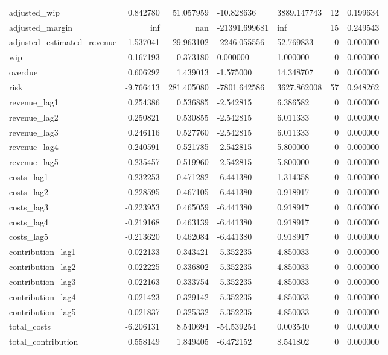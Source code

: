 \begin{landscape}
\begin{longtable}[h!]{lrrllrr}
adjusted_wip & 0.842780 & 51.057959 & -10.828636 & 3889.147743 & 12 & 0.199634 \\
adjusted_margin & inf & nan & -21391.699681 & inf & 15 & 0.249543 \\
adjusted_estimated_revenue & 1.537041 & 29.963102 & -2246.055556 & 52.769833 & 0 & 0.000000 \\
wip & 0.167193 & 0.373180 & 0.000000 & 1.000000 & 0 & 0.000000 \\
overdue & 0.606292 & 1.439013 & -1.575000 & 14.348707 & 0 & 0.000000 \\
risk & -9.766413 & 281.405080 & -7801.642586 & 3627.862008 & 57 & 0.948262 \\
revenue_lag1 & 0.254386 & 0.536885 & -2.542815 & 6.386582 & 0 & 0.000000 \\
revenue_lag2 & 0.250821 & 0.530855 & -2.542815 & 6.011333 & 0 & 0.000000 \\
revenue_lag3 & 0.246116 & 0.527760 & -2.542815 & 6.011333 & 0 & 0.000000 \\
revenue_lag4 & 0.240591 & 0.521785 & -2.542815 & 5.800000 & 0 & 0.000000 \\
revenue_lag5 & 0.235457 & 0.519960 & -2.542815 & 5.800000 & 0 & 0.000000 \\
costs_lag1 & -0.232253 & 0.471282 & -6.441380 & 1.314358 & 0 & 0.000000 \\
costs_lag2 & -0.228595 & 0.467105 & -6.441380 & 0.918917 & 0 & 0.000000 \\
costs_lag3 & -0.223953 & 0.465059 & -6.441380 & 0.918917 & 0 & 0.000000 \\
costs_lag4 & -0.219168 & 0.463139 & -6.441380 & 0.918917 & 0 & 0.000000 \\
costs_lag5 & -0.213620 & 0.462084 & -6.441380 & 0.918917 & 0 & 0.000000 \\
contribution_lag1 & 0.022133 & 0.343421 & -5.352235 & 4.850033 & 0 & 0.000000 \\
contribution_lag2 & 0.022225 & 0.336802 & -5.352235 & 4.850033 & 0 & 0.000000 \\
contribution_lag3 & 0.022163 & 0.333754 & -5.352235 & 4.850033 & 0 & 0.000000 \\
contribution_lag4 & 0.021423 & 0.329142 & -5.352235 & 4.850033 & 0 & 0.000000 \\
contribution_lag5 & 0.021837 & 0.325332 & -5.352235 & 4.850033 & 0 & 0.000000 \\
total_costs & -6.206131 & 8.540694 & -54.539254 & 0.003540 & 0 & 0.000000 \\
total_contribution & 0.558149 & 1.849405 & -6.472152 & 8.541802 & 0 & 0.000000 \\

\end{longtable}
\end{landscape}
